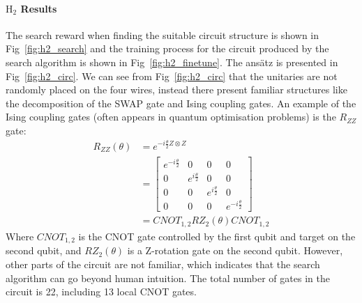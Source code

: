 \documentclass{ieeeaccess}
\begin{document}
\paragraph{$\text{H}_2$ Results} The search reward when finding the suitable circuit structure is shown in Fig~\ref{fig:h2_search} and the training process for the circuit produced by the search algorithm is shown in Fig~\ref{fig:h2_finetune}. The ans\"atz is presented in Fig~\ref{fig:h2_circ}. We can see from Fig~\ref{fig:h2_circ} that the unitaries are not randomly placed on the four wires, instead there present familiar structures like the decomposition of the SWAP gate and Ising coupling gates. An example of the Ising coupling gates (often appears in quantum optimisation problems) is the $R_{ZZ}$ gate:
\begin{equation}
    \begin{split}
R_{Z Z}(\theta)&=e^{ -i \frac{\theta}{2} Z \otimes Z}\\
&=\left[\begin{array}{cccc}
e^{-i \frac{\theta}{2}} & 0 & 0 & 0 \\
0 & e^{i \frac{\theta}{2}} & 0 & 0 \\
0 & 0 & e^{i \frac{\theta}{2}} & 0 \\
0 & 0 & 0 & e^{-i \frac{\theta}{2}}
\end{array}\right]\\ 
&= CNOT_{1,2}RZ_{2}(\theta)CNOT_{1,2}
\end{split}
\end{equation}
Where $CNOT_{1,2}$ is the CNOT gate controlled by the first qubit and target on the second qubit, and $RZ_{2}(\theta)$ is a Z-rotation gate on the second qubit.
However, other parts of the circuit are not familiar, which indicates that the search algorithm can go beyond human intuition. The total number of gates in the circuit is 22, including 13 local CNOT gates.
\end{document}

